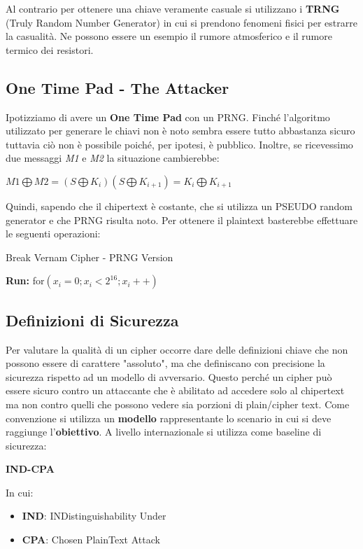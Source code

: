 \documentclass{article}
\theoremstyle{remark}
\begin{document}
Al contrario per ottenere una chiave veramente casuale si utilizzano i \textbf{TRNG} (Truly Random Number Generator) in cui si prendono fenomeni fisici per estrarre la casualità. Ne possono essere un esempio il rumore atmosferico e il rumore termico dei resistori. 
\subsection{One Time Pad - The Attacker}
Ipotizziamo di avere un \textbf{One Time Pad} con un PRNG. Finché l'algoritmo utilizzato per generare le chiavi non è noto sembra essere tutto abbastanza sicuro tuttavia ciò non è possibile poiché, per ipotesi, è pubblico. Inoltre, se ricevessimo due messaggi \emph{M1} e \emph{M2} la situazione cambierebbe:
\begin{center}
    $M1\bigoplus M2 = (S\bigoplus K_i)(S\bigoplus K_{i+1}) = K_i\bigoplus K_{i+1}$
\end{center}
Quindi, sapendo che il chipertext è costante, che si utilizza un PSEUDO random generator e che PRNG risulta noto. Per ottenere il plaintext basterebbe effettuare le seguenti operazioni:
\begin{algorithm}
\caption{Break Vernam Cipher - PRNG Version}\label{alg:cap}
\begin{algorithmic}
\State \textbf{Run:} for$(x_i=0;x_i<2^{16};x_i++)$
{}
\end{algorithmic}
\end{algorithm}

\subsection{Definizioni di Sicurezza}
Per valutare la qualità di un cipher occorre dare delle definizioni chiave che non possono essere di carattere "assoluto", ma che definiscano con precisione la sicurezza rispetto ad un modello di avversario. Questo perché un cipher può essere sicuro contro un attaccante che è abilitato ad accedere solo al chipertext ma non contro quelli che possono vedere sia porzioni di plain/cipher text. Come convenzione si utilizza un \textbf{modello} rappresentante lo scenario in cui si deve raggiunge l'\textbf{obiettivo}.
A livello internazionale si utilizza come baseline di sicurezza:
\begin{center}
    \textbf{IND-CPA}
\end{center}
In cui:\begin{itemize}
    \item \textbf{IND}: INDistinguishability \newline
    Under
    \item \textbf{CPA}: Chosen PlainText Attack
\end{itemize}
\end{document}
